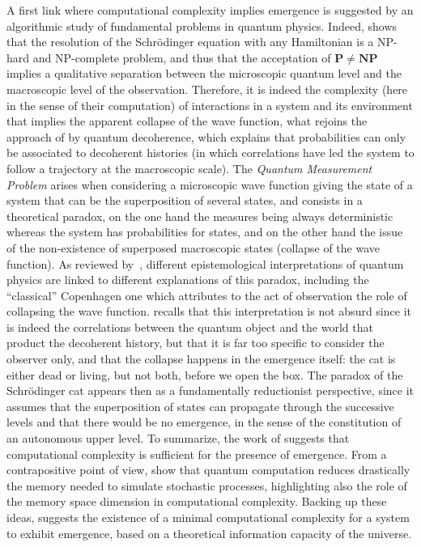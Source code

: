 A first link where computational complexity implies emergence is suggested by an algorithmic study of fundamental problems in quantum physics. Indeed, \cite{2014arXiv1403.7686B} shows that the resolution of the Schrödinger equation with any Hamiltonian is a NP-hard and NP-complete problem, and thus that the acceptation of $\mathbf{P}\neq\mathbf{NP}$ implies a qualitative separation between the microscopic quantum level and the macroscopic level of the observation. Therefore, it is indeed the complexity (here in the sense of their computation) of interactions in a system and its environment that implies the apparent collapse of the wave function, what rejoins the approach of \cite{gell1996quantum} by quantum decoherence, which explains that probabilities can only be associated to decoherent histories (in which correlations have led the system to follow a trajectory at the macroscopic scale). The \emph{Quantum Measurement Problem} arises when considering a microscopic wave function giving the state of a system that can be the superposition of several states, and consists in a theoretical paradox, on the one hand the measures being always deterministic whereas the system has probabilities for states, and on the other hand the issue of the non-existence of superposed macroscopic states (collapse of the wave function). As reviewed by~\cite{schlosshauer2005decoherence}, different epistemological interpretations of quantum physics are linked to different explanations of this paradox, including the ``classical'' Copenhagen one which attributes to the act of observation the role of collapsing the wave function. \cite{gell1996quantum} recalls that this interpretation is not absurd since it is indeed the correlations between the quantum object and the world that product the decoherent history, but that it is far too specific to consider the observer only, and that the collapse happens in the emergence itself: the cat is either dead or living, but not both, before we open the box. The paradox of the Schrödinger cat appears then as a fundamentally reductionist perspective, since it assumes that the superposition of states can propagate through the successive levels and that there would be no emergence, in the sense of the constitution of an autonomous upper level. To summarize, the work of \cite{2014arXiv1403.7686B} suggests that computational complexity is sufficient for the presence of emergence. From a contrapositive point of view, \cite{2017arXiv170404231E} show that quantum computation reduces drastically the memory needed to simulate stochastic processes, highlighting also the role of the memory space dimension in computational complexity. Backing up these ideas, \cite{davies2004emergent} suggests the existence of a minimal computational complexity for a system to exhibit emergence, based on a theoretical information capacity of the universe.


